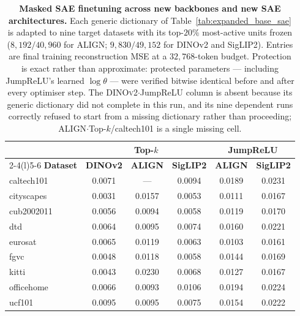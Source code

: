 \begin{table}[htbp]
\centering
\small
\caption{\textbf{Masked SAE finetuning across new backbones and new SAE architectures.}
Each generic dictionary of Table~\ref{tab:expanded_base_sae} is adapted to nine target
datasets with its top-$20\%$ most-active units frozen ($8{,}192/40{,}960$ for ALIGN;
$9{,}830/49{,}152$ for DINOv2 and SigLIP2). Entries are final training reconstruction
MSE at a $32{,}768$-token budget. Protection is exact rather than approximate: protected
parameters --- including JumpReLU's learned $\log\theta$ --- were verified bitwise
identical before and after every optimiser step. The \textsc{DINOv2}$\cdot$JumpReLU
column is absent because its generic dictionary did not complete in this run, and its
nine dependent runs correctly refused to start from a missing dictionary rather than
proceeding; \textsc{ALIGN}$\cdot$Top-$k$/caltech101 is a single missing cell.}
\label{tab:expanded_masked_ft}
\setlength{\tabcolsep}{7pt}
\begin{tabular}{lccccc}
\toprule
& \multicolumn{3}{c}{\textbf{Top-$k$}} & \multicolumn{2}{c}{\textbf{JumpReLU}} \\
\cmidrule(r){2-4}\cmidrule(l){5-6}
\textbf{Dataset} & \textbf{DINOv2} & \textbf{ALIGN} & \textbf{SigLIP2} & \textbf{ALIGN} & \textbf{SigLIP2} \\
\midrule
caltech101 & 0.0071 & --- & 0.0094 & 0.0189 & 0.0231 \\
cityscapes & 0.0031 & 0.0157 & 0.0053 & 0.0111 & 0.0167 \\
cub2002011 & 0.0056 & 0.0094 & 0.0058 & 0.0119 & 0.0170 \\
dtd        & 0.0064 & 0.0095 & 0.0074 & 0.0160 & 0.0221 \\
eurosat    & 0.0065 & 0.0119 & 0.0063 & 0.0103 & 0.0161 \\
fgvc       & 0.0048 & 0.0118 & 0.0058 & 0.0144 & 0.0169 \\
kitti      & 0.0043 & 0.0230 & 0.0068 & 0.0127 & 0.0167 \\
officehome & 0.0066 & 0.0093 & 0.0106 & 0.0194 & 0.0224 \\
ucf101     & 0.0095 & 0.0095 & 0.0075 & 0.0154 & 0.0222 \\
\bottomrule
\end{tabular}
\end{table}

